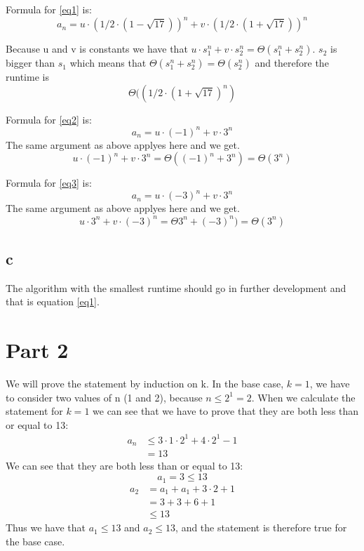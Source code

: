 \documentclass[a4paper]{article}
\begin{document}
Formula for \ref{eq1} is:
\[a_n=u \cdot (1/2 \cdot (1 - \sqrt{17}))^n + v \cdot (1/2 \cdot (1 + \sqrt{17}))^n\]

Because u and v is constants we have that \(u \cdot s_1^n + v \cdot s_2^n = \Theta (s_1^n + s_2^n)\). $s_2$ is bigger than $s_1$ which means that \(\Theta (s_1^n + s_2^n) = \Theta (s_2^n)\) and therefore the runtime is \[\Theta ((1/2 \cdot (1 + \sqrt{17})^n)\]


Formula for \ref{eq2} is:
\[a_n=u \cdot (-1)^n + v \cdot 3^n\]
The same argument as above applyes here and we get.
\[u \cdot (-1)^n + v \cdot 3^n = \Theta ((-1)^n + 3^n) = \Theta (3^n)\]


Formula for \ref{eq3} is:
\[a_n=u \cdot (-3)^n + v \cdot 3^n\]
The same argument as above applyes here and we get.
\[u \cdot 3^n + v \cdot (-3)^n = \Theta 3^n + (-3)^n) = \Theta (3^n)\]

\subsection*{c}
The algorithm with the smallest runtime should go in further development and that is equation \ref{eq1}.

\section*{Part 2}

We will prove the statement by induction on k.
In the base case, \(k=1\), we have to consider two values of n (1 and 2), because $n\leq2^1=2$. When we calculate the statement for $k=1$ we can see that we have to prove that they are both less than or equal to 13:
\[
\begin{aligned}
  a_n & \leq 3 \cdot 1 \cdot 2^1 + 4 \cdot 2^1 - 1\\
  & = 13
\end{aligned}
\]
We can see that they are both less than or equal to 13:
\[
a_1 = 3 \leq 13
\]\[
\begin{aligned}
  a_2 & = a_1 + a_1 + 3 \cdot 2 + 1 \\
  & = 3 + 3 + 6 + 1 \\
  & \leq 13
\end{aligned}
\]
Thus we have that $a_1 \leq 13$ and $a_2 \leq 13$, and the statement is therefore true for the base case.
\end{document}
